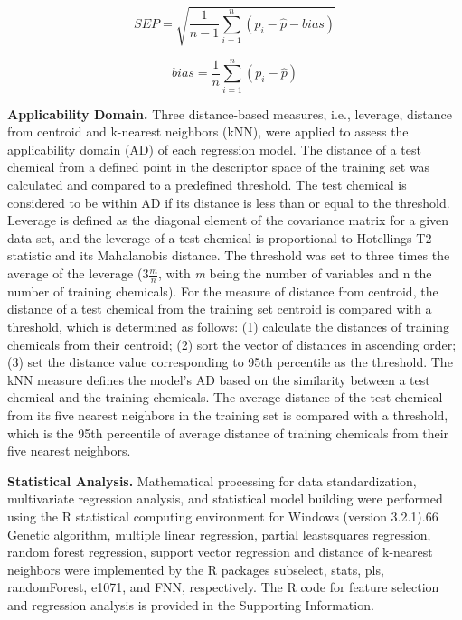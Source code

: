 \documentclass[10pt, letter]{report}
\renewcommand{\=}{\, =\, }
\newcommand{\+}{\, +\, }
\renewcommand{\-}{\, -\, }
\begin{document}
\begin{equation}
SEP = \sqrt{\frac{1}{n-1}\sum_{i = 1}^n(p_{i}-\hat{p} - bias)}
\end{equation}

\begin{equation}
bias = \frac{1}{n}\sum_{i = 1}^{n}(p_{i}-\hat{p})
\end{equation}

\textbf{Applicability Domain.} Three distance-based measures, i.e.,
leverage, distance from centroid and k-nearest neighbors
(kNN), were applied to assess the applicability domain (AD)
of each regression model. The distance of a test chemical from
a defined point in the descriptor space of the training set was
calculated and compared to a predefined threshold. The
test chemical is considered to be within AD if its distance is less
than or equal to the threshold. Leverage is defined as the
diagonal element of the covariance matrix for a given data set,
and the leverage of a test chemical is proportional to Hotellings
T2 statistic and its Mahalanobis distance. The threshold was set
to three times the average of the leverage (3\(\frac{m}{n}\), with \textit{m} being
the number of variables and n the number of training
chemicals). For the measure of distance from centroid, the
distance of a test chemical from the training set centroid is
compared with a threshold, which is determined as follows: (1)
calculate the distances of training chemicals from their centroid;
(2) sort the vector of distances in ascending order; (3) set the
distance value corresponding to 95th percentile as the
threshold. The kNN measure defines the model’s AD based
on the similarity between a test chemical and the training
chemicals. The average distance of the test chemical from its
five nearest neighbors in the training set is compared with a
threshold, which is the 95th percentile of average distance of
training chemicals from their five nearest neighbors.

\textbf{Statistical Analysis.} Mathematical processing for data
standardization, multivariate regression analysis, and statistical
model building were performed using the R statistical
computing environment for Windows (version 3.2.1).66
Genetic algorithm, multiple linear regression, partial leastsquares
regression, random forest regression, support vector
regression and distance of k-nearest neighbors were implemented
by the R packages subselect, stats, pls, randomForest,
e1071, and FNN, respectively. The R code for feature selection
and regression analysis is provided in the Supporting
Information.
\end{document}

